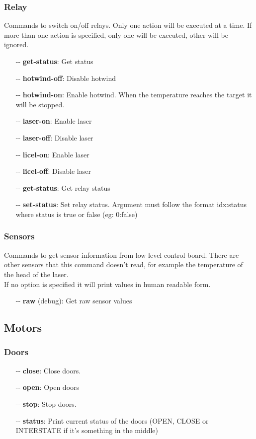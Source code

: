 \documentclass[letterpaper, 10 pt]{article}
\begin{document}
\subsubsection{Relay}
Commands to switch on/off relays. Only one action will be executed at a time. If more than one action is specified, only one will be executed, other will be ignored.
\begin{itemize}
	\item[-{}-] \textbf{get-status}: Get status
	\item[-{}-] \textbf{hotwind-off}: Disable hotwind
	\item[-{}-] \textbf{hotwind-on}: Enable hotwind. When the temperature reaches the target it will be stopped.
	\item[-{}-] \textbf{laser-on}: Enable laser
	\item[-{}-] \textbf{laser-off}: Disable laser
	\item[-{}-] \textbf{licel-on}: Enable laser
	\item[-{}-] \textbf{licel-off}: Disable laser
	\item[-{}-] \textbf{get-status}: Get relay status
	\item[-{}-] \textbf{set-status}: Set relay status. Argument must follow the format idx:status where status is true or false (eg: 0:false)
\end{itemize}

\subsubsection{Sensors}
Commands to get sensor information from low level control board. There are other sensors that this command doesn't read, for example the temperature of the head of the laser.\\
If no option is specified it will print values in human readable form.
\begin{itemize}
	\item[-{}-] \textbf{raw} (debug): Get raw sensor values
\end{itemize}

\subsection{Motors}
\subsubsection{Doors}
\begin{itemize}
	\item[-{}-] \textbf{close}: Close doors.
	\item[-{}-] \textbf{open}: Open doors
	\item[-{}-] \textbf{stop}: Stop doors. 
	\item[-{}-] \textbf{status}: Print current status of the doors (OPEN, CLOSE or INTERSTATE if it's something in the middle)
\end{itemize}
\end{document}
